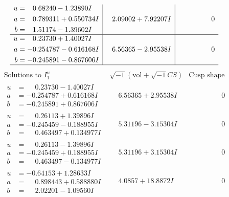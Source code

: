 \documentclass[1p]{elsarticle_modified}
\theoremstyle{definition}
\newcommand{\I}{\sqrt{-1}}
\begin{document}
$$\begin{array}{c|c|c}
\begin{aligned}
u &= \phantom{-}0.68240 - 1.23890 I \\
a &= \phantom{-}0.789311 + 0.550734 I \\
b &= \phantom{-}1.51174 - 1.39602 I\end{aligned}
 & \phantom{-}2.09002 + 7.92207 I & \phantom{-0.000000 } 0 \\ \hline\begin{aligned}
u &= \phantom{-}0.23730 + 1.40027 I \\
a &= -0.254787 - 0.616168 I \\
b &= -0.245891 - 0.867606 I\end{aligned}
 & \phantom{-}6.56365 - 2.95538 I & \phantom{-0.000000 } 0\\
 \hline 
 \end{array}$$\newpage$$\begin{array}{c|c|c}  
\text{Solutions to }I^u_{1}& \I (\text{vol} + \sqrt{-1}CS) & \text{Cusp shape}\\
 \hline 
\begin{aligned}
u &= \phantom{-}0.23730 - 1.40027 I \\
a &= -0.254787 + 0.616168 I \\
b &= -0.245891 + 0.867606 I\end{aligned}
 & \phantom{-}6.56365 + 2.95538 I & \phantom{-0.000000 } 0 \\ \hline\begin{aligned}
u &= \phantom{-}0.26113 + 1.39896 I \\
a &= -0.245459 - 0.188955 I \\
b &= \phantom{-}0.463497 + 0.134977 I\end{aligned}
 & \phantom{-}5.31196 - 3.15304 I & \phantom{-0.000000 } 0 \\ \hline\begin{aligned}
u &= \phantom{-}0.26113 - 1.39896 I \\
a &= -0.245459 + 0.188955 I \\
b &= \phantom{-}0.463497 - 0.134977 I\end{aligned}
 & \phantom{-}5.31196 + 3.15304 I & \phantom{-0.000000 } 0 \\ \hline\begin{aligned}
u &= -0.64153 + 1.28633 I \\
a &= \phantom{-}0.898443 + 0.588880 I \\
b &= \phantom{-}2.02201 - 1.09560 I\end{aligned}
 & \phantom{-}4.0857 + 18.8872 I & \phantom{-0.000000 } 0 \\ \hline\begin{aligned}

\end{aligned}
\end{array}$$
\end{document}
